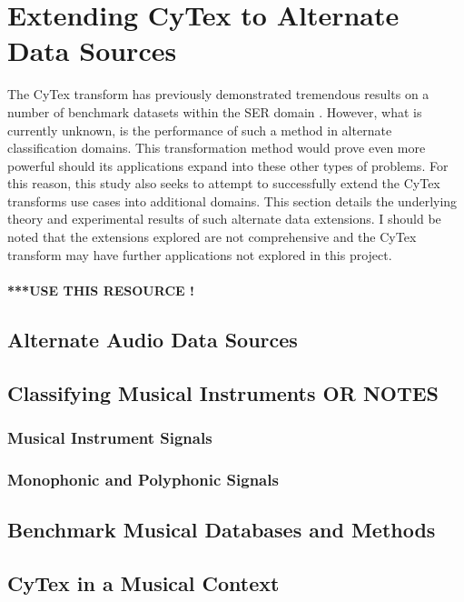 \chapter{Extending CyTex to Alternate Data Sources}\label{ch-ext-cytex}
The CyTex transform has previously demonstrated tremendous results on a number of benchmark datasets within the SER domain \cite{CyTexRef}. However, what is currently unknown, is the performance of such a method in alternate classification domains. This transformation method would prove even more powerful should its applications expand into these other types of problems. For this reason, this study also seeks to attempt to successfully extend the CyTex transforms use cases into additional domains. This section details the underlying theory and experimental results of such alternate data extensions. I should be noted that the extensions explored are not comprehensive and the CyTex transform may have further applications not explored in this project.\\ \\
\textbf{***USE THIS RESOURCE \cite{won2021music}!}


\section{Alternate Audio Data Sources}


\section{Classifying Musical Instruments OR NOTES}
\subsection{Musical Instrument Signals}


\subsection{Monophonic and Polyphonic Signals}


\section{Benchmark Musical Databases and Methods}


\section{CyTex in a Musical Context}
